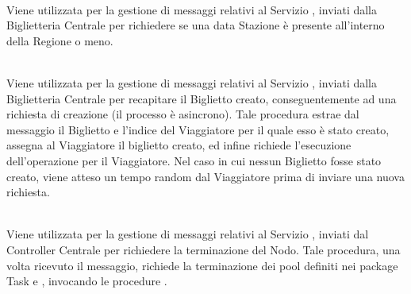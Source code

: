 \begin{description}
		\item {}\\
		Viene utilizzata per la gestione di messaggi relativi al Servizio , inviati dalla Biglietteria Centrale per richiedere se una data Stazione è presente all'interno della Regione o meno.
		
		
		\item {}\\
		Viene utilizzata per la gestione di messaggi relativi al Servizio , inviati dalla Biglietteria Centrale per recapitare il Biglietto creato, conseguentemente ad una richiesta di creazione (il processo è asincrono). Tale procedura estrae dal messaggio il Biglietto e l'indice del Viaggiatore per il quale esso è stato creato, assegna al Viaggiatore il biglietto creato, ed infine richiede l'esecuzione dell'operazione  per il Viaggiatore. Nel caso in cui nessun Biglietto fosse stato creato, viene atteso un tempo random dal Viaggiatore prima di inviare una nuova richiesta.
		
		\item {}\\
		Viene utilizzata per la gestione di messaggi relativi al Servizio , inviati dal Controller Centrale per richiedere la terminazione del Nodo. Tale procedura, una volta ricevuto il messaggio, richiede la terminazione dei pool definiti nei package Task  e , invocando le procedure .
		
	\end{description}
